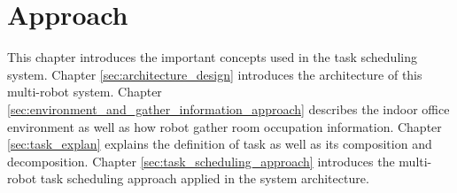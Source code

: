 \chapter{Approach}



This chapter introduces the important concepts used in the task scheduling system. Chapter \ref{sec:architecture_design} introduces the architecture of this multi-robot system. Chapter \ref{sec:environment_and_gather_information_approach} describes the indoor office environment as well as how robot gather room occupation information. Chapter \ref{sec:task_explan} explains the definition of task as well as its composition and decomposition. Chapter \ref{sec:task_scheduling_approach} introduces the multi-robot task scheduling approach applied in the system architecture.

